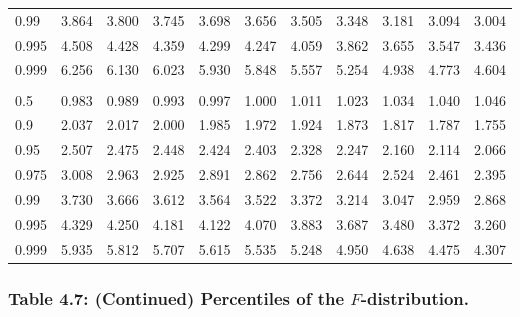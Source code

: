 \documentclass[
]{article}
\begin{document}
\begin{table}[H]
\begin{tabular}{lrrrrrrrrrr}
\hspace{1em}0.99 & 3.864 & 3.800 & 3.745 & 3.698 & 3.656 & 3.505 & 3.348 & 3.181 & 3.094 & 3.004\\
\hspace{1em}0.995 & 4.508 & 4.428 & 4.359 & 4.299 & 4.247 & 4.059 & 3.862 & 3.655 & 3.547 & 3.436\\
\hspace{1em}0.999 & 6.256 & 6.130 & 6.023 & 5.930 & 5.848 & 5.557 & 5.254 & 4.938 & 4.773 & 4.604\\
\addlinespace[0.3em]
\multicolumn{11}{l}{\textbf{$k_2=15$}}\\
\hspace{1em}0.5 & 0.983 & 0.989 & 0.993 & 0.997 & 1.000 & 1.011 & 1.023 & 1.034 & 1.040 & 1.046\\
\hspace{1em}0.9 & 2.037 & 2.017 & 2.000 & 1.985 & 1.972 & 1.924 & 1.873 & 1.817 & 1.787 & 1.755\\
\hspace{1em}0.95 & 2.507 & 2.475 & 2.448 & 2.424 & 2.403 & 2.328 & 2.247 & 2.160 & 2.114 & 2.066\\
\hspace{1em}0.975 & 3.008 & 2.963 & 2.925 & 2.891 & 2.862 & 2.756 & 2.644 & 2.524 & 2.461 & 2.395\\
\hspace{1em}0.99 & 3.730 & 3.666 & 3.612 & 3.564 & 3.522 & 3.372 & 3.214 & 3.047 & 2.959 & 2.868\\
\hspace{1em}0.995 & 4.329 & 4.250 & 4.181 & 4.122 & 4.070 & 3.883 & 3.687 & 3.480 & 3.372 & 3.260\\
\hspace{1em}0.999 & 5.935 & 5.812 & 5.707 & 5.615 & 5.535 & 5.248 & 4.950 & 4.638 & 4.475 & 4.307\\
\bottomrule
\end{tabular}
\end{table}

\newpage

\hypertarget{table-4.7-continued-percentiles-of-the-f-distribution.}{%
\subsubsection{\texorpdfstring{Table 4.7: (Continued) Percentiles of the
\(F\)-distribution.}{Table 4.7: (Continued) Percentiles of the F-distribution.}}\label{table-4.7-continued-percentiles-of-the-f-distribution.}}
\end{document}
